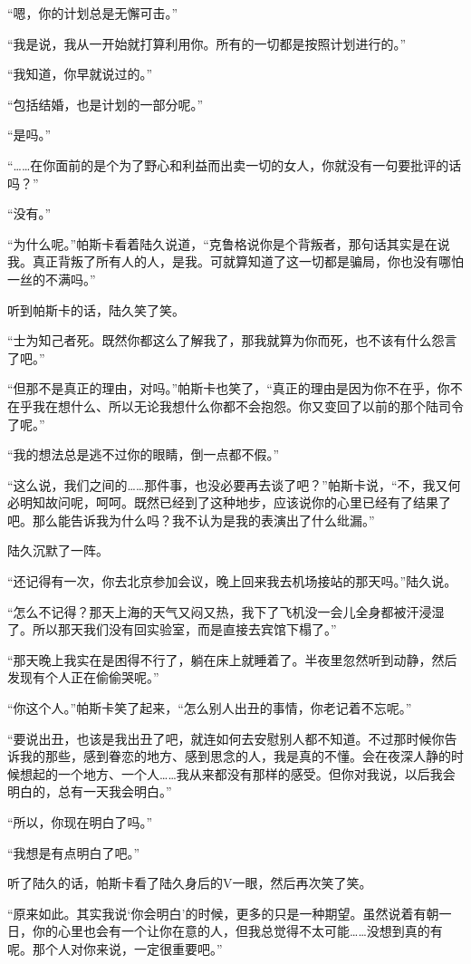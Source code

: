 “嗯，你的计划总是无懈可击。”

“我是说，我从一开始就打算利用你。所有的一切都是按照计划进行的。”

“我知道，你早就说过的。”

“包括结婚，也是计划的一部分呢。”

“是吗。”

“……在你面前的是个为了野心和利益而出卖一切的女人，你就没有一句要批评的话吗？”

“没有。”

“为什么呢。”帕斯卡看着陆久说道，“克鲁格说你是个背叛者，那句话其实是在说我。真正背叛了所有人的人，是我。可就算知道了这一切都是骗局，你也没有哪怕一丝的不满吗。”

听到帕斯卡的话，陆久笑了笑。

“士为知己者死。既然你都这么了解我了，那我就算为你而死，也不该有什么怨言了吧。”

“但那不是真正的理由，对吗。”帕斯卡也笑了，“真正的理由是因为你不在乎，你不在乎我在想什么、所以无论我想什么你都不会抱怨。你又变回了以前的那个陆司令了呢。”

“我的想法总是逃不过你的眼睛，倒一点都不假。”

“这么说，我们之间的……那件事，也没必要再去谈了吧？”帕斯卡说，“不，我又何必明知故问呢，呵呵。既然已经到了这种地步，应该说你的心里已经有了结果了吧。那么能告诉我为什么吗？我不认为是我的表演出了什么纰漏。”

陆久沉默了一阵。

“还记得有一次，你去北京参加会议，晚上回来我去机场接站的那天吗。”陆久说。

“怎么不记得？那天上海的天气又闷又热，我下了飞机没一会儿全身都被汗浸湿了。所以那天我们没有回实验室，而是直接去宾馆下榻了。”

“那天晚上我实在是困得不行了，躺在床上就睡着了。半夜里忽然听到动静，然后发现有个人正在偷偷哭呢。”

“你这个人。”帕斯卡笑了起来，“怎么别人出丑的事情，你老记着不忘呢。”

“要说出丑，也该是我出丑了吧，就连如何去安慰别人都不知道。不过那时候你告诉我的那些，感到眷恋的地方、感到思念的人，我是真的不懂。会在夜深人静的时候想起的一个地方、一个人……我从来都没有那样的感受。但你对我说，以后我会明白的，总有一天我会明白。”

“所以，你现在明白了吗。”

“我想是有点明白了吧。”

听了陆久的话，帕斯卡看了陆久身后的V一眼，然后再次笑了笑。

“原来如此。其实我说‘你会明白’的时候，更多的只是一种期望。虽然说着有朝一日，你的心里也会有一个让你在意的人，但我总觉得不太可能……没想到真的有呢。那个人对你来说，一定很重要吧。”

